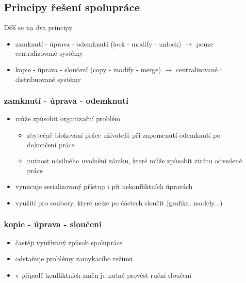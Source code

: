 \documentclass{szzclass}
\begin{document}
\subsection{Principy řešení spolupráce}
Dělí se na dva principy
\begin{itemize}
    \item zamknutí - úprava - odemknutí (lock - modify - unlock) $\rightarrow$ pouze centralizované systémy
    \item kopie - úprava - sloučení (copy - modify - merge) $\rightarrow$ centralizované i distribuované systémy
\end{itemize}
\subsubsection{zamknutí - úprava - odemknutí}
\begin{itemize}
    \item může způsobit organizační problém
    \begin{itemize}
        \item zbytečně blokovaní práce uživatelů při zapomenutí odemknutí po dokončení práce
        \item nutnost násilného uvolnění zámku, které může způsobit ztrátu odvedené práce
    \end{itemize}
    \item vynucuje serializovaný přístup i při nekonfliktních úpravách
    \item využítí pro soubory, které nelze po částech sloučit (grafika, modely...)
\end{itemize}
\subsubsection{kopie - úprava - sloučení}
\begin{itemize}
    \item častěji využívaný způsob spolupráce
    \item odstaňuje problémy zamykacího režimu
    \item v případě konfliktních změn je nutné provést ruční sloučení
\end{itemize}
\end{document}
